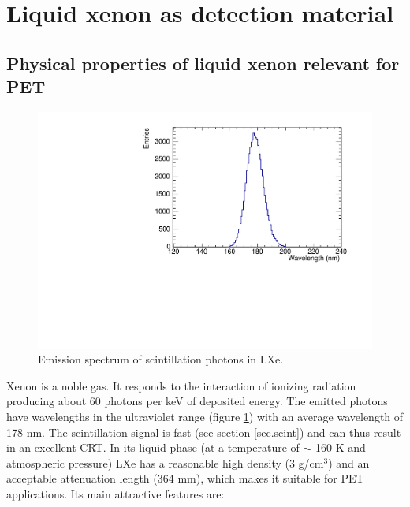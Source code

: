 \documentclass[11pt,a4paper]{article}
\begin{document}
\section{Liquid xenon as detection material}
\label{sec.LXe}


\subsection*{Physical properties of liquid xenon relevant for PET}


\begin{figure}[!bhtp]
	\centering
	\includegraphics[scale=0.6]{img/ScintillationSpectrumLXe.pdf}
	\caption{\label{fig.spectrumLXe} Emission spectrum of scintillation photons in LXe.}
\end{figure}

Xenon is a noble gas. It responds to the interaction of ionizing radiation producing about 60 photons per keV of deposited energy. The emitted photons have wavelengths in the ultraviolet range 
(figure \ref{fig.spectrumLXe}) with an average wavelength of 178 nm. The scintillation signal is fast 
(see section \ref{sec.scint}) and can thus result in an excellent CRT.  In its liquid phase (at a temperature of $\sim$ 160 K and atmospheric pressure) LXe has a reasonable high density (3 g/cm$^3$) and an acceptable attenuation length (364 mm), which makes it suitable for PET applications. Its main attractive features are:
\end{document}
